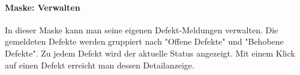 \begin{figure}[!h]
\hfill
{}
\end{figure}

\paragraph{Maske: Verwalten}
In dieser Maske kann man seine eigenen Defekt-Meldungen verwalten. Die gemeldeten Defekte werden gruppiert nach "Offene Defekte" und "Behobene Defekte". Zu jedem Defekt wird der aktuelle Status angezeigt. Mit einem Klick auf einen Defekt erreicht man dessen Detailanzeige.

